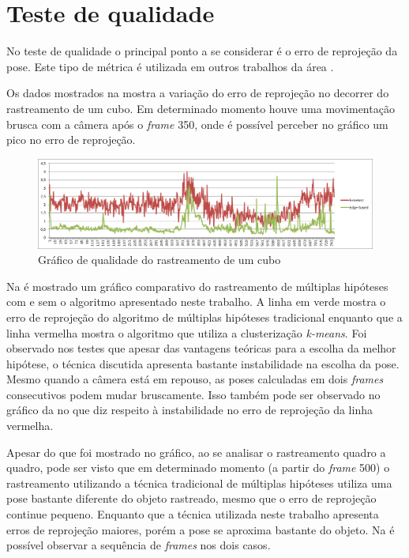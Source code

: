 \section{Teste de qualidade}

No teste de qualidade o principal ponto a se considerar é o erro de reprojeção da pose. Este tipo de métrica é utilizada em outros trabalhos da área \cite{tgchico}.

Os dados mostrados na  mostra a variação do erro de reprojeção no decorrer do rastreamento de um cubo. Em determinado momento houve uma movimentação brusca com a câmera após o \emph{frame} 350, onde é possível perceber no gráfico um pico no erro de reprojeção.

\begin{figure}[!ht]
\centering\includegraphics[width=\textwidth]{monografia/qualidade_cubo_real}
\caption{Gráfico de qualidade do rastreamento de um cubo}
\label{qualidade_cubo_real}
\end{figure}

Na  é mostrado um gráfico comparativo do rastreamento de múltiplas hipóteses com e sem o algoritmo apresentado neste trabalho. A linha em verde mostra o erro de reprojeção do algoritmo de múltiplas hipóteses tradicional enquanto que a linha vermelha mostra o algoritmo que utiliza a clusterização \emph{k-means}. Foi observado nos testes que apesar das vantagens teóricas para a escolha da melhor hipótese, o técnica discutida apresenta bastante instabilidade na escolha da pose. Mesmo quando a câmera está em repouso, as poses calculadas em dois \emph{frames} consecutivos podem mudar bruscamente. Isso também pode ser observado no gráfico da  no que diz respeito à instabilidade no erro de reprojeção da linha vermelha.

Apesar do que foi mostrado no gráfico, ao se analisar o rastreamento quadro a quadro, pode ser visto que em determinado momento (a partir do \emph{frame} 500) o rastreamento utilizando a técnica tradicional de múltiplas hipóteses utiliza uma pose bastante diferente do objeto rastreado, mesmo que o erro de reprojeção continue pequeno. Enquanto que a técnica utilizada neste trabalho apresenta erros de reprojeção maiores, porém a pose se aproxima bastante do objeto. Na  é possível observar a sequência de \emph{frames} nos dois casos.


